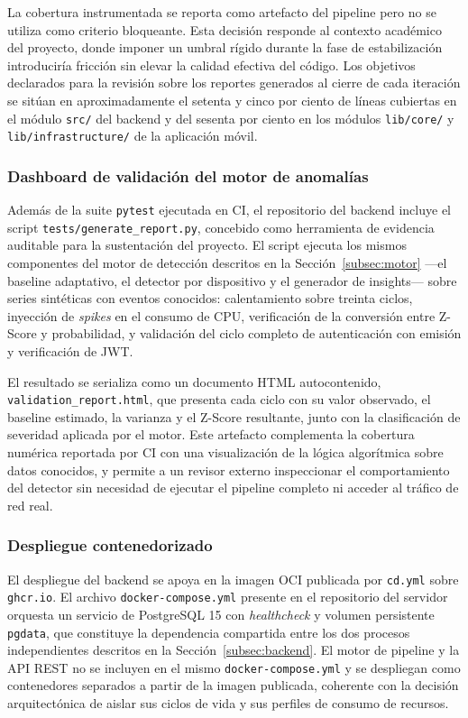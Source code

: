 La cobertura instrumentada se reporta como artefacto del pipeline
pero no se utiliza como criterio bloqueante. Esta decisión responde
al contexto académico del proyecto, donde imponer un umbral rígido
durante la fase de estabilización introduciría fricción sin elevar
la calidad efectiva del código. Los objetivos declarados para la
revisión sobre los reportes generados al cierre de cada iteración
se sitúan en aproximadamente el setenta y cinco por ciento de
líneas cubiertas en el módulo \texttt{src/} del backend y del
sesenta por ciento en los módulos \texttt{lib/core/} y
\texttt{lib/infrastructure/} de la aplicación móvil.

\subsubsection{Dashboard de validación del motor de anomalías}

Además de la suite \texttt{pytest} ejecutada en CI, el repositorio
del backend incluye el script \texttt{tests/generate\_report.py},
concebido como herramienta de evidencia auditable para la
sustentación del proyecto. El script ejecuta los mismos
componentes del motor de detección descritos en la
Sección~\ref{subsec:motor} ---el baseline adaptativo, el detector
por dispositivo y el generador de insights--- sobre series
sintéticas con eventos conocidos: calentamiento sobre treinta
ciclos, inyección de \textit{spikes} en el consumo de CPU,
verificación de la conversión entre Z-Score y probabilidad, y
validación del ciclo completo de autenticación con emisión y
verificación de JWT.

El resultado se serializa como un documento HTML autocontenido,
\texttt{validation\_report.html}, que presenta cada ciclo con su
valor observado, el baseline estimado, la varianza y el Z-Score
resultante, junto con la clasificación de severidad aplicada por
el motor. Este artefacto complementa la cobertura numérica
reportada por CI con una visualización de la lógica algorítmica
sobre datos conocidos, y permite a un revisor externo inspeccionar
el comportamiento del detector sin necesidad de ejecutar el
pipeline completo ni acceder al tráfico de red real.

\subsubsection{Despliegue contenedorizado}

El despliegue del backend se apoya en la imagen OCI publicada por
\texttt{cd.yml} sobre \texttt{ghcr.io}. El archivo
\texttt{docker-compose.yml} presente en el repositorio del servidor
orquesta un servicio de PostgreSQL 15 con \textit{healthcheck} y
volumen persistente \texttt{pgdata}, que constituye la dependencia
compartida entre los dos procesos independientes descritos en la
Sección~\ref{subsec:backend}. El motor de pipeline y la API REST
no se incluyen en el mismo \texttt{docker-compose.yml} y se
despliegan como contenedores separados a partir de la imagen
publicada, coherente con la decisión arquitectónica de aislar sus
ciclos de vida y sus perfiles de consumo de recursos.


